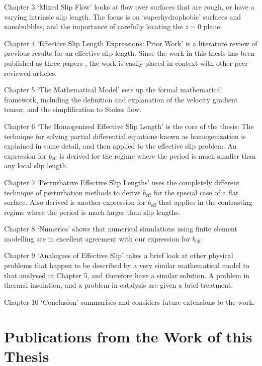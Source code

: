 \documentclass[12pt, a4paper, twoside, openright]{book}
\newcommand{\beff}{\ensuremath{b_{\mathrm{eff}}}}
\begin{document}
Chapter 3 `Mixed Slip Flow' looks at flow over surfaces that are rough, or have a varying intrinsic slip length.  The focus is on `superhydrophobic' surfaces and nanobubbles, and the importance of carefully locating the $z=0$ plane.

Chapter 4 `Effective Slip Length Expressions: Prior Work' is a literature review of previous results for an effective slip length.  Since the work in this thesis has been published as three papers \cite{HendyLund2007, LundHendy2008, Lund2012}, the work is easily placed in context with other peer-reviewed articles.

Chapter 5 `The Mathematical Model' sets up the formal mathematical framework, including the definition and explanation of the velocity gradient tensor, and the simplification to Stokes flow.

Chapter 6 `The Homogenized Effective Slip Length' is the core of the thesis: The technique for solving partial differential equations known as homogenization is explained in some detail, and then applied to the effective slip problem.  An expression for $\beff$ is derived for the regime where the period is much smaller than any local slip length.

Chapter 7 `Perturbative Effective Slip Lengths' uses the completely different technique of perturbation methods to derive $\beff$ for the special case of a flat surface.  Also derived is another expression for $\beff$ that applies in the contrasting regime where the period is much larger than slip lengths.

Chapter 8 `Numerics' shows that numerical simulations using finite element modelling are in excellent agreement with our expression for $\beff$.

Chapter 9 `Analogues of Effective Slip' takes a brief look at other physical problems that happen to be described by a very similar mathematical model to that analysed in Chapter 5, and therefore have a similar solution.  A problem in thermal insulation, and a problem in catalysis are given a brief treatment.

Chapter 10 `Conclusion' summarises and considers future extensions to the work.


\section{Publications from the Work of this Thesis}

\end{document}
